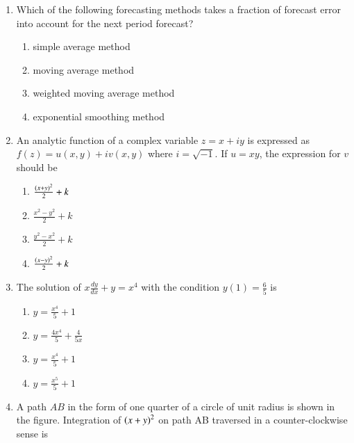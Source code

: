 \documentclass[journal]{IEEEtran}
\begin{document}
\begin{enumerate}
    \item Which of the following forecasting methods takes a fraction of forecast
    error into account for the next period forecast?
    \begin{multicols}{2}
    \begin{enumerate}
        \item simple average method
        \item moving average method
        \item weighted moving average method
        \item exponential smoothing method
    \end{enumerate}
    \end{multicols}

    \item An analytic function of a complex variable $z = x + iy$ is expressed as
    $f(z) = u(x, y) + iv(x, y)$ where $i = \sqrt{-1}$. If $u = xy$, the expression
    for $v$ should be
    \begin{multicols}{4}
    \begin{enumerate}
        \item $\frac{\left(x + y\right)^2}{2} + k$
        \item $\frac{x^2 - y^2}{2} + k$
        \item $\frac{y^2 - x^2}{2} + k$
        \item $\frac{\left(x - y\right)^2}{2} + k$
    \end{enumerate}
    \end{multicols}

    \item The solution of $x\frac{dy}{dx} + y = x^4$ with the condition
    $y(1) = \frac{6}{5}$ is
    \begin{multicols}{4}
    \begin{enumerate}
        \item $y = \frac{x^4}{5} + 1$
        \item $y = \frac{4x^4}{5} + \frac{4}{5x}$
        \item $y = \frac{x^4}{5} + 1$
        \item $y = \frac{x^5}{5} + 1$
    \end{enumerate}
    \end{multicols}

    \item A path $AB$ in the form of one quarter of a circle of unit radius is shown
    in the figure. Integration of $\left(x + y\right)^2$ on path AB traversed in a
    counter-clockwise sense is


\end{enumerate}
\end{document}
